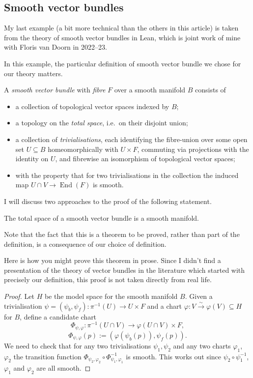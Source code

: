 \documentclass[12pt]{llncs}
\begin{document}
\subsection{Smooth vector bundles}

My last example (a bit more technical than the others in this article)
is taken from the theory of smooth vector bundles in Lean,
which is joint work of mine with Floris van Doorn in 2022--23.

In this example, the particular definition of smooth vector bundle we chose for our theory matters.

\begin{definition}
A \emph{smooth vector bundle} with \emph{fibre} $F$ over a smooth manifold $B$ consists of
\begin{itemize}
  \item a collection of topological vector spaces indexed by $B$;
  \item a topology on the \emph{total space}, i.e.\ on their disjoint union;
  \item a collection of \emph{trivialisations}, each identifying the fibre-union over some open set
  $U\subseteq B$ homeomorphically with $U\times F$, commuting via projections with the identity on
  $U$, and fibrewise an isomorphism of topological vector spaces;
  \item with the property that for two trivialisations in the collection the induced map
  $U\cap V \to \operatorname{End}(F)$ is smooth.
\end{itemize}
\end{definition}

I will discuss two approaches to the proof of the following statement.

\begin{proposition}
  The total space of a smooth vector bundle is a smooth manifold.
\end{proposition}


Note that the fact that this is a theorem to be proved, rather than part of the definition,
is a consequence of our choice of definition.

Here is how you might prove this theorem in prose.
Since I didn't find a presentation of the theory of vector bundles in the literature
which started with precisely our definition,
this proof is not taken directly from real life.

\begin{proof}
Let $H$ be the model space for the smooth manifold $B$.  Given a trivialisation
$\psi =(\psi_b,\psi_f): \pi^{-1}(U)\to U \times F$ and a chart
$\varphi : V \mathrel{\overset{\sim}{\to}} \varphi(V)\subseteq H$ for $B$, define a candidate chart
\[
  \Phi_{\psi,\varphi}:\pi^{-1}(U\cap V) \to \varphi(U \cap V) \times F,
\]
\[
  \Phi_{\psi,\varphi}(p) := (\varphi(\psi_b(p)), \psi_f(p)).
\]
We need to check that for any two trivialisations $\psi_1, \psi_2$ and any two charts $\varphi_1$,
$\varphi_2$ the transition function $\Phi_{\psi_2,\varphi_2} \circ \Phi_{\psi_1,\varphi_1}^{-1}$ is
smooth.  This works out since $\psi_2\circ\psi_1^{-1}$, $\varphi_1$ and $\varphi_2$ are all smooth.
\end{proof}
\end{document}
